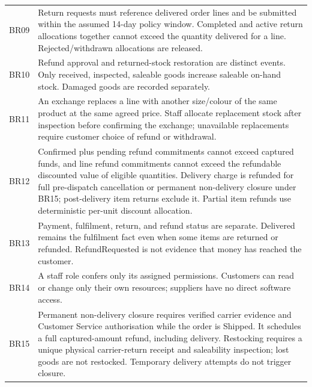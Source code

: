 \begin{longtable}{P{.1\linewidth}P{.8\linewidth}}
BR09 & Return requests must reference delivered order lines and be submitted within the assumed 14-day policy window. Completed and active return allocations together cannot exceed the quantity delivered for a line. Rejected/withdrawn allocations are released.\\
BR10 & Refund approval and returned-stock restoration are distinct events. Only received, inspected, saleable goods increase saleable on-hand stock. Damaged goods are recorded separately.\\
BR11 & An exchange replaces a line with another size/colour of the same product at the same agreed price. Staff allocate replacement stock after inspection before confirming the exchange; unavailable replacements require customer choice of refund or withdrawal.\\
BR12 & Confirmed plus pending refund commitments cannot exceed captured funds, and line refund commitments cannot exceed the refundable discounted value of eligible quantities. Delivery charge is refunded for full pre-dispatch cancellation or permanent non-delivery closure under BR15; post-delivery item returns exclude it. Partial item refunds use deterministic per-unit discount allocation.\\
BR13 & Payment, fulfilment, return, and refund status are separate. Delivered remains the fulfilment fact even when some items are returned or refunded. RefundRequested is not evidence that money has reached the customer.\\
BR14 & A staff role confers only its assigned permissions. Customers can read or change only their own resources; suppliers have no direct software access.\\
BR15 & Permanent non-delivery closure requires verified carrier evidence and Customer Service authorisation while the order is Shipped. It schedules a full captured-amount refund, including delivery. Restocking requires a unique physical carrier-return receipt and saleability inspection; lost goods are not restocked. Temporary delivery attempts do not trigger closure.\\
\bottomrule
\end{longtable}
